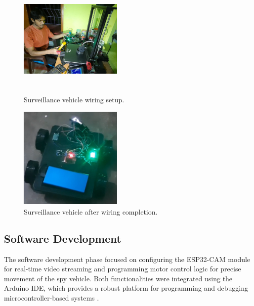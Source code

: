 \documentclass[12pt,a4paper]{report}
\begin{document}
\begin{enumerate}
\begin{itemize}
\begin{figure}[H]
    \centering
    \begin{minipage}{0.45\textwidth}
        \centering
        \includegraphics[width=5cm, height=5cm]{wireManagement}
        \caption{Surveillance vehicle wiring setup.}
        \label{fig:wireManagement}
    \end{minipage} \hfill
    \begin{minipage}{0.45\textwidth}
        \centering
        \includegraphics[width=5cm, height=5cm]{vehicle2}
        \caption{Surveillance vehicle after wiring completion.}
        \label{fig:vehicle2}
    \end{minipage}
\end{figure}







\end{itemize}



\end{enumerate}


\label{Software Development}
\subsection{Software Development}

The software development phase focused on configuring the ESP32-CAM module for real-time video streaming and programming motor control logic for precise movement of the spy vehicle. Both functionalities were integrated using the Arduino IDE, which provides a robust platform for programming and debugging microcontroller-based systems \cite{esp32cam}.
\end{document}
